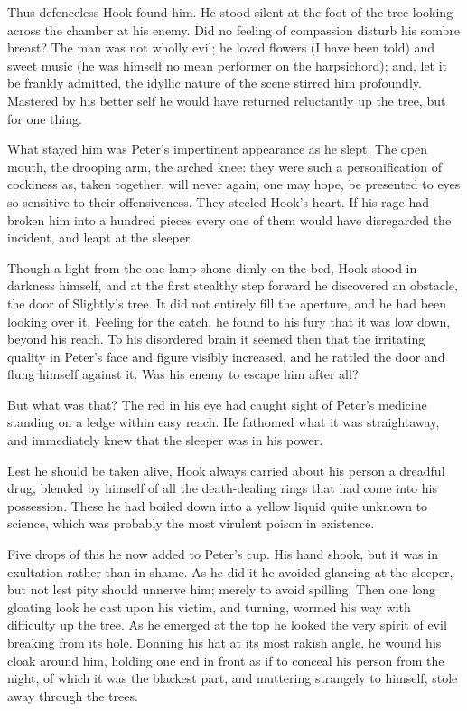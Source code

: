 Thus defenceless Hook found him. He stood silent at the foot of the tree
looking across the chamber at his enemy. Did no feeling of compassion
disturb his sombre breast? The man was not wholly evil; he loved flowers
(I have been told) and sweet music (he was himself no mean performer on
the harpsichord); and, let it be frankly admitted, the idyllic nature of
the scene stirred him profoundly. Mastered by his better self he would
have returned reluctantly up the tree, but for one thing.


What stayed him was Peter's impertinent appearance as he slept. The open
mouth, the drooping arm, the arched knee: they were such a personification
of cockiness as, taken together, will never again, one may hope, be
presented to eyes so sensitive to their offensiveness. They steeled Hook's
heart. If his rage had broken him into a hundred pieces every one of them
would have disregarded the incident, and leapt at the sleeper.


Though a light from the one lamp shone dimly on the bed, Hook stood in
darkness himself, and at the first stealthy step forward he discovered an
obstacle, the door of Slightly's tree. It did not entirely fill the
aperture, and he had been looking over it. Feeling for the catch, he found
to his fury that it was low down, beyond his reach. To his disordered
brain it seemed then that the irritating quality in Peter's face and
figure visibly increased, and he rattled the door and flung himself
against it. Was his enemy to escape him after all?


But what was that? The red in his eye had caught sight of Peter's medicine
standing on a ledge within easy reach. He fathomed what it was
straightaway, and immediately knew that the sleeper was in his power.


Lest he should be taken alive, Hook always carried about his person a
dreadful drug, blended by himself of all the death-dealing rings that had
come into his possession. These he had boiled down into a yellow liquid
quite unknown to science, which was probably the most virulent poison in
existence.


Five drops of this he now added to Peter's cup. His hand shook, but it was
in exultation rather than in shame. As he did it he avoided glancing at
the sleeper, but not lest pity should unnerve him; merely to avoid
spilling. Then one long gloating look he cast upon his victim, and
turning, wormed his way with difficulty up the tree. As he emerged at the
top he looked the very spirit of evil breaking from its hole. Donning his
hat at its most rakish angle, he wound his cloak around him, holding one
end in front as if to conceal his person from the night, of which it was
the blackest part, and muttering strangely to himself, stole away through
the trees.


